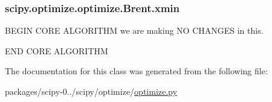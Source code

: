 \subsubsection[{xmin}]{\setlength{\rightskip}{0pt plus 5cm}scipy.\+optimize.\+optimize.\+Brent.\+xmin}\label{classscipy_1_1optimize_1_1optimize_1_1Brent_ab14c763f87128fc218426f32f235e34c}


B\+E\+G\+I\+N C\+O\+R\+E A\+L\+G\+O\+R\+I\+T\+H\+M we are making N\+O C\+H\+A\+N\+G\+E\+S in this. 

E\+N\+D C\+O\+R\+E A\+L\+G\+O\+R\+I\+T\+H\+M 

The documentation for this class was generated from the following file\+:\begin{DoxyCompactItemize}
\item 
packages/scipy-\/0../scipy/optimize/\hyperlink{optimize_8py}{optimize.\+py}\end{DoxyCompactItemize}
